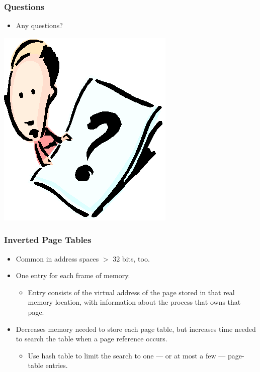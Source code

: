 \documentclass[CJKutf8,xcolor=pdftex,dvipsnames,table]{beamer}
\begin{document}
\begin{CJK*}{UTF8}{song}
  \begin{frame}
  \frametitle{Questions}
  \begin{itemize}
  \item{Any questions?}
  \end{itemize}
  \begin{center}
    \includegraphics[scale=.5]{question}
  \end{center}
  \end{frame}
  
  \begin{frame}
  \frametitle{Inverted Page Tables} \pause
  \begin{itemize}
  \item{Common in address spaces $>$ 32 bits, too.} \pause
  \item{One entry for each frame of memory.} \pause
    \begin{itemize}
    \item{Entry consists of the virtual address of the page stored in that real memory location, with information about the process that owns that page.} \pause
    \end{itemize}
  \item{Decreases memory needed to store each page table, but increases time needed to search the table when a page reference occurs.} \pause
    \begin{itemize}
    \item{Use hash table to limit the search to one — or at most a few — page-table entries.}
    \end{itemize}
  \end{itemize}
  \end{frame}
  

\end{CJK*}
\end{document}
